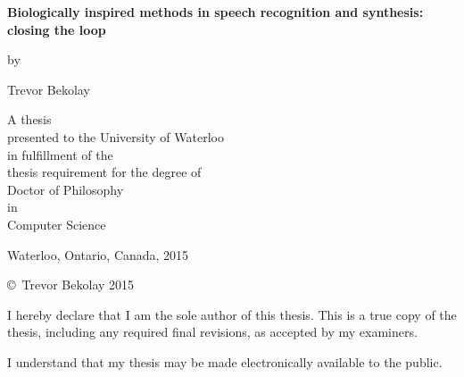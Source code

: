 \pagestyle{empty}

\begin{titlepage}
  \begin{center}
    \vspace*{1.0cm}

    \Huge
    {\bf Biologically inspired methods in speech recognition and synthesis:
    closing the loop}

    \vspace*{1.0cm}

    \normalsize
    by \\

    \vspace*{1.0cm}

    \Large
    Trevor Bekolay \\

    \vspace*{3.0cm}

    \normalsize
    A thesis \\
    presented to the University of Waterloo \\
    in fulfillment of the \\
    thesis requirement for the degree of \\
    Doctor of Philosophy \\
    in \\
    Computer Science \\

    \vspace*{2.0cm}

    Waterloo, Ontario, Canada, 2015 \\

    \vspace*{1.0cm}

    \copyright\ Trevor Bekolay 2015 \\
  \end{center}
\end{titlepage}

\pagestyle{plain}
\setcounter{page}{2}

\cleardoublepage

\noindent
I hereby declare that I am the sole author of this thesis. This is a
true copy of the thesis, including any required final revisions, as
accepted by my examiners.

\bigskip

\noindent
I understand that my thesis may be made electronically available to
the public.

\cleardoublepage
